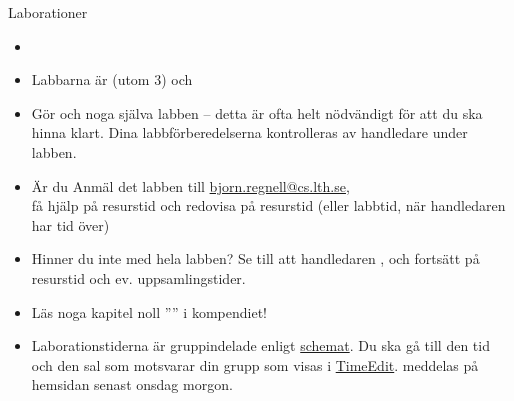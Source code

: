 \ifkompendium\else  %
\begin{Slide}{Laborationer}\footnotesize
\begin{itemize}
\item {}

\item Labbarna är  (utom 3) och 

\item Gör  och  noga  själva labben -- detta är ofta helt nödvändigt för att du ska hinna klart. Dina labbförberedelserna kontrolleras av handledare under labben.

\item Är du  Anmäl det  labben till \url{bjorn.regnell@cs.lth.se}, \\ få hjälp på resurstid och redovisa på resurstid (eller labbtid, när handledaren har tid över)

\item Hinner du inte med hela labben? Se till att handledaren , och fortsätt på resurstid och ev. uppsamlingstider.

\item Läs noga kapitel noll '''' i kompendiet!

\item Laborationstiderna är gruppindelade enligt \href{http://cs.lth.se/pgk/schema/}{schemat}. Du ska gå till den tid och den sal som motsvarar din grupp som visas i \href{http://cs.lth.se/pgk/schema/timeedit}{TimeEdit}.  meddelas på hemsidan senast onsdag morgon.
\end{itemize}
\end{Slide}


